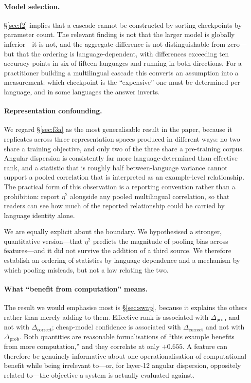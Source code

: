 \documentclass[11pt]{article}
\newcommand{\claim}[1]{#1}   %
\begin{document}
\paragraph{Model selection.} \S\ref{sec:f2} implies that a cascade cannot be
constructed by sorting checkpoints by parameter count. The relevant finding is
not that the larger model is globally inferior---it is not, and the aggregate
difference is not distinguishable from zero---but that the ordering is
language-dependent, with differences exceeding ten accuracy points in six of
fifteen languages and running in both directions. For a practitioner building a
multilingual cascade this converts an assumption into a measurement: which
checkpoint is the ``expensive'' one must be determined per language, and in some
languages the answer inverts.

\paragraph{Representation confounding.} We regard
\S\ref{sec:f3a} as the most generalisable result in the paper, because it
replicates across three representation spaces produced in different ways: no two
share a training objective, and only two of the three share a pre-training
corpus. Angular dispersion
is consistently far more language-determined than effective rank, and a statistic
that is roughly half between-language variance cannot support a pooled
correlation that is interpreted as an example-level relationship. The practical
form of this observation is a reporting convention rather than a prohibition:
\claim{report $\eta^2$ alongside any pooled multilingual correlation}, so that
readers can see how much of the reported relationship could be carried by
language identity alone.

We are equally explicit about the boundary. We hypothesised a stronger,
quantitative version---that $\eta^2$ predicts the magnitude of pooling bias
across features---and it did not survive the addition of a third source. We
therefore establish an ordering of statistics by language dependence and a
mechanism by which pooling misleads, but not a law relating the two.

\paragraph{What ``benefit from computation'' means.} The result we would
emphasise most is \S\ref{sec:swap}, because it explains the others rather
than merely adding to them. Effective rank is associated with
$\Delta_{\mathrm{prob}}$ and not with $\Delta_{\mathrm{correct}}$; cheap-model
confidence is associated with $\Delta_{\mathrm{correct}}$ and not with
$\Delta_{\mathrm{prob}}$. Both quantities are reasonable formalisations of ``this
example benefits from more computation,'' and they correlate at only $+0.655$.
\claim{A feature can therefore be genuinely informative about one
operationalisation of computational benefit while being irrelevant to---or, for
layer-12 angular dispersion, oppositely related to---the objective a system is
actually evaluated against.}
\end{document}
